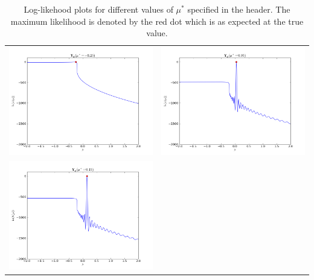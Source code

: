 \documentclass[12pt,a4paper,titlepage]{article}
\begin{document}
\begin{table}[ht]
\begin{tabular}{cc}
\includegraphics[scale=0.3]{likelihood_snic025m}&\includegraphics[scale=0.3]{likelihood_snic005}\\
\newline
\includegraphics[scale=0.3]{likelihood_snic015}
\end{tabular}
\caption{Log-likehood plots for different values of $\mu^*$ specified in the header. The maximum likelihood is denoted by the red dot which is as expected at the true value.}
\label{fig:hopf}
\end{table}
\end{document}
